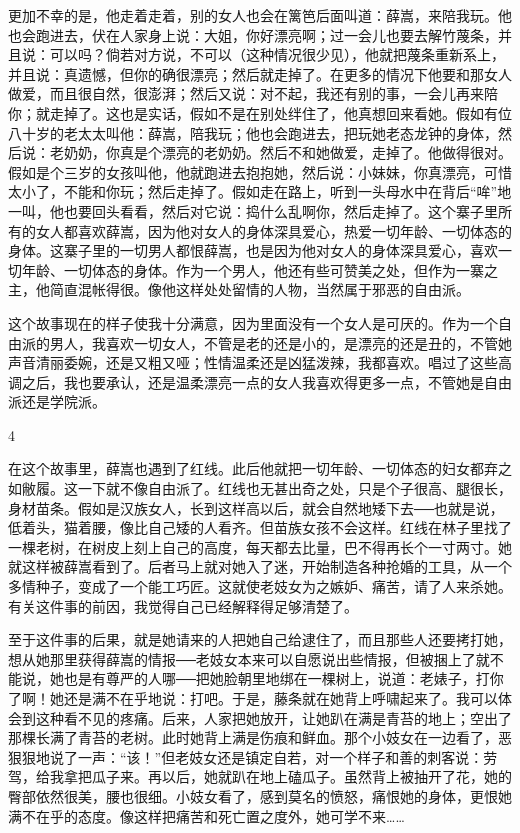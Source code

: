 更加不幸的是，他走着走着，别的女人也会在篱笆后面叫道：薛嵩，来陪我玩。他也会跑进去，伏在人家身上说：大姐，你好漂亮啊；过一会儿也要去解竹蔑条，并且说：可以吗？倘若对方说，不可以（这种情况很少见），他就把蔑条重新系上，并且说：真遗憾，但你的确很漂亮；然后就走掉了。在更多的情况下他要和那女人做爱，而且很自然，很澎湃；然后又说：对不起，我还有别的事，一会儿再来陪你；就走掉了。这也是实话，假如不是在别处绊住了，他真想回来看她。假如有位八十岁的老太太叫他：薛嵩，陪我玩；他也会跑进去，把玩她老态龙钟的身体，然后说：老奶奶，你真是个漂亮的老奶奶。然后不和她做爱，走掉了。他做得很对。假如是个三岁的女孩叫他，他就跑进去抱抱她，然后说：小妹妹，你真漂亮，可惜太小了，不能和你玩；然后走掉了。假如走在路上，听到一头母水中在背后“哞”地一叫，他也要回头看看，然后对它说：捣什么乱啊你，然后走掉了。这个寨子里所有的女人都喜欢薛嵩，因为他对女人的身体深具爱心，热爱一切年龄、一切体态的身体。这寨子里的一切男人都恨薛嵩，也是因为他对女人的身体深具爱心，喜欢一切年龄、一切体态的身体。作为一个男人，他还有些可赞美之处，但作为一寨之主，他简直混帐得很。像他这样处处留情的人物，当然属于邪恶的自由派。 

这个故事现在的样子使我十分满意，因为里面没有一个女人是可厌的。作为一个自由派的男人，我喜欢一切女人，不管是老的还是小的，是漂亮的还是丑的，不管她声音清丽委婉，还是又粗又哑；性情温柔还是凶猛泼辣，我都喜欢。唱过了这些高调之后，我也要承认，还是温柔漂亮一点的女人我喜欢得更多一点，不管她是自由派还是学院派。 

4 

在这个故事里，薛嵩也遇到了红线。此后他就把一切年龄、一切体态的妇女都弃之如敝履。这一下就不像自由派了。红线也无甚出奇之处，只是个子很高、腿很长，身材苗条。假如是汉族女人，长到这样高以后，就会自然地矮下去──也就是说，低着头，猫着腰，像比自己矮的人看齐。但苗族女孩不会这样。红线在林子里找了一棵老树，在树皮上刻上自己的高度，每天都去比量，巴不得再长个一寸两寸。她就这样被薛嵩看到了。后者马上就对她入了迷，开始制造各种抢婚的工具，从一个多情种子，变成了一个能工巧匠。这就使老妓女为之嫉妒、痛苦，请了人来杀她。有关这件事的前因，我觉得自己已经解释得足够清楚了。 

至于这件事的后果，就是她请来的人把她自己给逮住了，而且那些人还要拷打她，想从她那里获得薛嵩的情报──老妓女本来可以自愿说出些情报，但被捆上了就不能说，她也是有尊严的人哪──把她脸朝里地绑在一棵树上，说道：老婊子，打你了啊！她还是满不在乎地说：打吧。于是，藤条就在她背上呼啸起来了。我可以体会到这种看不见的疼痛。后来，人家把她放开，让她趴在满是青苔的地上；空出了那棵长满了青苔的老树。此时她背上满是伤痕和鲜血。那个小妓女在一边看了，恶狠狠地说了一声：“该！”但老妓女还是镇定自若，对一个样子和善的刺客说：劳驾，给我拿把瓜子来。再以后，她就趴在地上磕瓜子。虽然背上被抽开了花，她的臀部依然很美，腰也很细。小妓女看了，感到莫名的愤怒，痛恨她的身体，更恨她满不在乎的态度。像这样把痛苦和死亡置之度外，她可学不来…… 


